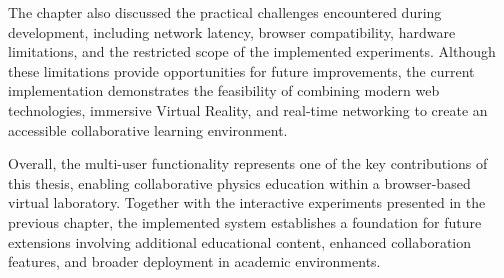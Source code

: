 The chapter also discussed the practical challenges encountered during development, including network latency, browser compatibility, hardware limitations, and the restricted scope of the implemented experiments. Although these limitations provide opportunities for future improvements, the current implementation demonstrates the feasibility of combining modern web technologies, immersive Virtual Reality, and real-time networking to create an accessible collaborative learning environment.

Overall, the multi-user functionality represents one of the key contributions of this thesis, enabling collaborative physics education within a browser-based virtual laboratory. Together with the interactive experiments presented in the previous chapter, the implemented system establishes a foundation for future extensions involving additional educational content, enhanced collaboration features, and broader deployment in academic environments.